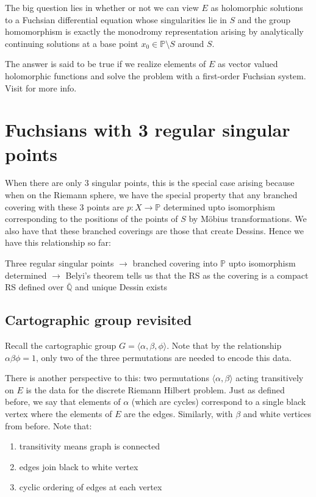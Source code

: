 \documentclass{article}
\theoremstyle{definition}
\newcommand{\PP}{\mathbb{P}}
\newcommand{\QQ}{\mathbb{Q}}
\begin{document}
The big question lies in whether or not we can view $E$ as holomorphic solutions to a Fuchsian differential equation whose singularities lie in $S$ and the group homomorphism is exactly the monodromy representation arising by analytically continuing solutions at a base point $x_0 \in \PP \setminus S$ around $S$.

The answer is said to be true if we realize elements of $E$ as vector valued holomorphic functions and solve the problem with a first-order Fuchsian system. Visit \cite{dessin_fuchsian} for more info.

\section{Fuchsians with 3 regular singular points}
When there are only 3 singular points, this is the special case arising because when on the Riemann sphere, we have the special property that any branched covering with these 3 points are $p: X \to \PP$ determined upto isomorphism corresponding to the positions of the points of $S$ by Möbius transformations. We also have that these branched coverings are those that create Dessins. Hence we have this relationship so far:

Three regular singular points $\rightarrow$ branched covering into $\PP$ upto isomorphism determined $\rightarrow$ Belyi's theorem tells us that the RS as the covering is a compact RS defined over $\bar{\QQ}$ and unique Dessin exists

\subsection{Cartographic group revisited}
Recall the cartographic group $G = \langle \alpha, \beta, \phi \rangle$. Note that by the relationship $\alpha\beta\phi=1$, only two of the three permutations are needed to encode this data. 

There is another perspective to this: two permutations $\langle \alpha,\beta \rangle$ acting transitively on $E$ is the data for the discrete Riemann Hilbert problem. Just as defined before, we say that elements of $\alpha$ (which are cycles) correspond to a single black vertex where the elements of $E$ are the edges. Similarly, with $\beta$ and white vertices from before. Note that:
\begin{enumerate}
    \item transitivity means graph is connected
    \item edges join black to white vertex
    \item cyclic ordering of edges at each vertex
\end{enumerate}
\end{document}
